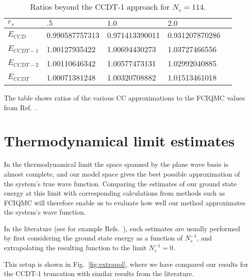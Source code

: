 \begin{table}[h]
\caption{Ratios beyond the CCDT-1 approach for $N_s = 114$.}
\begin{center}
\begin{threeparttable}
\begin{tabular}{l l l l l}
    \toprule
$r_s$ & $.5$ & $1.0$ & $2.0$ \\ \hline
$E_{CCD} $& 0.990587757313 & 0.971413390011 & 0.931207870286 \\
$E_{CCDT-1}$& 1.00127935422 & 1.00694430273 & 1.03727466556 \\ 
$E_{CCDT-2}$& 1.00110646342 & 1.00577473131 & 1.02992040885 \\
$E_{CCDT}$ & 1.00071381248 & 1.00320708882 & 1.01513461018 \\
\bottomrule
\end{tabular}
\begin{tablenotes}
The table shows ratios of the various CC approximations to the FCIQMC values from Ref.~\cite{Shepherd2012}.
\end{tablenotes}
\end{threeparttable}
\end{center}
\label{tab:ccdt_2_comparisonII}
\end{table}



\FloatBarrier

\section{Thermodynamical limit estimates}

In the thermodynamical limit the space spanned by the plane wave basis
is almost complete, and our model space gives the best possible
approximation of the system's true wave function. Comparing the
estimates of our ground state energy at this limit with corresponding
calculations from methods such as FCIQMC will therefore enable us to
evaluate how well our method approximates the system's wave function.

In the literature (see for example Refs.~\cite{Shepherd2012,Shepherd2013, Shepherd2014, Baardsen2014, Roggero2013}), such
estimates are usually performed by first considering the ground state
energy as a function of $N_{s}^{-1}$, and extrapolating the resulting
function to the limit $N_{s}^{-1} = 0$.

This setup is shown in Fig.~\ref{fig:extrapol}, where we have compared
our results for the CCDT-1 truncation with similar results from the literature.

